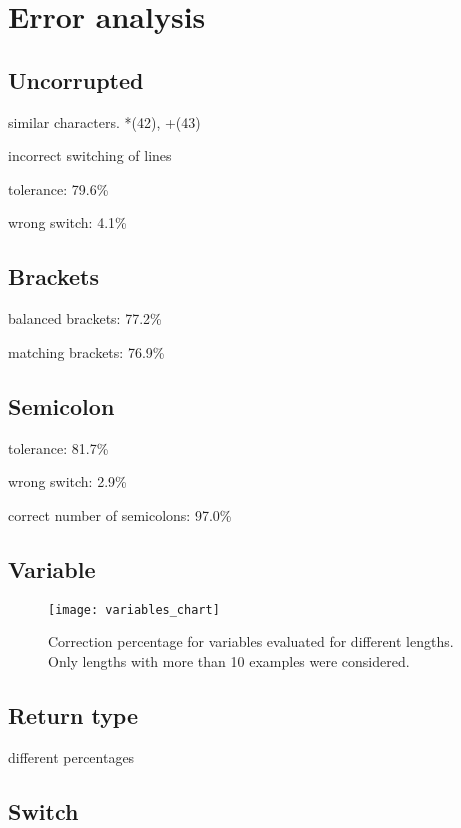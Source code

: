 \section{Error analysis}

\subsection{Uncorrupted}

similar characters. *(42), +(43)

incorrect switching of lines

tolerance: 79.6\%

wrong switch: 4.1\%

\subsection{Brackets}

balanced brackets: 77.2\%

matching brackets: 76.9\%

\subsection{Semicolon}

tolerance: 81.7\%

wrong switch: 2.9\%

correct number of semicolons: 97.0\%

\subsection{Variable}

\begin{figure}[p]
\centering
\texttt{[image: variables\_chart]}
\caption{Correction percentage for variables evaluated for different lengths. Only lengths with more than 10 examples were considered.}
\label{variables_chart}
\end{figure}

\subsection{Return type}

different percentages

\subsection{Switch}

